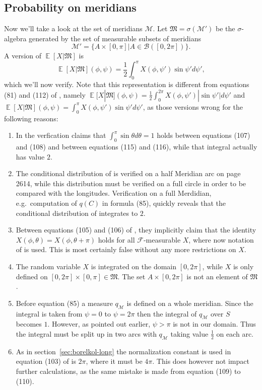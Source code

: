 \documentclass[twoside,a4paper]{article}
\theoremstyle{plain}
\theoremstyle{definition}
\theoremstyle{remark}
\numberwithin{equation}{section}
\DeclareMathOperator{\E}{\mathbb{E}}
\DeclareMathOperator{\1}{\mathbbm{1}}
\newcommand{\F}{\mathcal{F}}
\newcommand{\B}{\mathcal{B}}
\begin{document}
\subsection{Probability on meridians}\label{sec:borelkol-mer}
Now we'll take a look at the set of meridians $\mathcal{M}$. Let $\mathfrak{M}=\sigma(\mathcal{M}')$ be the $\sigma$-algebra generated by the set of measurable subsets of meridians \[\mathcal{M}'=\{A\times[0,\pi]|A\in\B([0,2\pi])\}.\] A version of $\E[X|\mathfrak{M}]$ is
\[\E[X|\mathfrak{M}](\phi,\psi)=\frac{1}{2}\int_0^{\pi}X(\phi,\psi')\sin\psi'd\psi',\]
which we'll now verify. Note that this representation is different from equations (81) and (112) of \cite{Gyenis17}, namely $\E[X|\mathfrak{M}](\phi,\psi)=\frac{1}{2}\int_0^{2\pi}X(\phi,\psi')|\sin\psi'|d\psi'$ and $\E[X|\mathfrak{M}](\phi,\psi)=\int_0^{\pi}X(\phi,\psi')\sin\psi'd\psi'$, as those versions wrong for the following reasons:
\begin{enumerate}
\item In the verfication \cite{Gyenis17} claims that $\int_0^\pi\sin\theta d\theta=1$ holds between equations (107) and (108) and between equations (115) and (116), while that integral actually has value $2$.
\item The conditional distribution of \cite{Gyenis17} is verified on a half Meridian arc on page 2614, while this distribution must be verified on a full circle in order to be compared with the longitudes. Verification on a full Merdidian, e.g.~computation of $q(C)$ in formula (85), quickly reveals that the conditional distribution of \cite{Gyenis17} integrates to $2$.
\item Between equations (105) and (106) of \cite{Gyenis17}, they implicitly claim that the identity $X(\phi,\theta)=X(\phi,\theta+\pi)$ holds for all $\F$-measurable $X$, where now notation of \cite{Gyenis17} is used. This is most certainly false without any more restrictions on $X$.
\item The random variable $X$ is integrated on the domain $[0,2\pi]$, while $X$ is only defined on $[0,2\pi]\times[0,\pi]\in\mathfrak{M}$. The set $A\times[0,2\pi]$ is not an element of $\mathfrak{M}$.
\item Before equation (85) a measure $q_\mathcal{M}$ is defined on a whole meridian. Since the integral is taken from $\psi=0$ to $\psi=2\pi$ then the integral of $q_\mathcal{M}$ over $S$ becomes $1$. However, as pointed out earlier, $\psi>\pi$ is not in our domain. Thus the integral must be split up in two arcs with $q_{\mathcal{M}}$ taking value $\frac{1}{2}$ on each arc.
\item As in section~\ref{sec:borelkol-long} the normalization constant is used in equation (103) of \cite{Gyenis17} is $2\pi$, where it must be $4\pi$. This does however not impact further calculations, as the same mistake is made from equation (109) to (110).
\end{enumerate}
\end{document}
